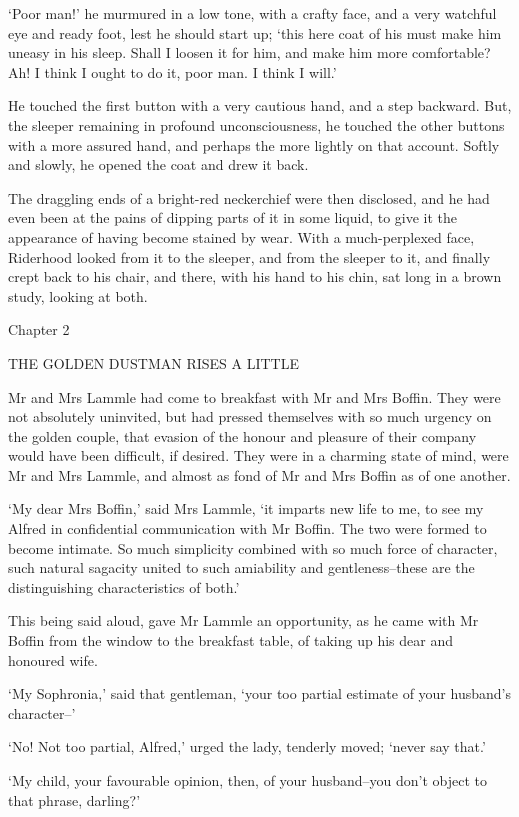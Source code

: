 ‘Poor man!’ he murmured in a low tone, with a crafty face, and a very
watchful eye and ready foot, lest he should start up; ‘this here coat
of his must make him uneasy in his sleep. Shall I loosen it for him,
and make him more comfortable? Ah! I think I ought to do it, poor man. I
think I will.’

He touched the first button with a very cautious hand, and a step
backward. But, the sleeper remaining in profound unconsciousness, he
touched the other buttons with a more assured hand, and perhaps the more
lightly on that account. Softly and slowly, he opened the coat and drew
it back.

The draggling ends of a bright-red neckerchief were then disclosed, and
he had even been at the pains of dipping parts of it in some liquid,
to give it the appearance of having become stained by wear. With a
much-perplexed face, Riderhood looked from it to the sleeper, and from
the sleeper to it, and finally crept back to his chair, and there, with
his hand to his chin, sat long in a brown study, looking at both.



Chapter 2

THE GOLDEN DUSTMAN RISES A LITTLE


Mr and Mrs Lammle had come to breakfast with Mr and Mrs Boffin. They
were not absolutely uninvited, but had pressed themselves with so much
urgency on the golden couple, that evasion of the honour and pleasure
of their company would have been difficult, if desired. They were in a
charming state of mind, were Mr and Mrs Lammle, and almost as fond of Mr
and Mrs Boffin as of one another.

‘My dear Mrs Boffin,’ said Mrs Lammle, ‘it imparts new life to me, to
see my Alfred in confidential communication with Mr Boffin. The two
were formed to become intimate. So much simplicity combined with so much
force of character, such natural sagacity united to such amiability and
gentleness--these are the distinguishing characteristics of both.’

This being said aloud, gave Mr Lammle an opportunity, as he came with Mr
Boffin from the window to the breakfast table, of taking up his dear and
honoured wife.

‘My Sophronia,’ said that gentleman, ‘your too partial estimate of your
husband’s character--’

‘No! Not too partial, Alfred,’ urged the lady, tenderly moved; ‘never
say that.’

‘My child, your favourable opinion, then, of your husband--you don’t
object to that phrase, darling?’

